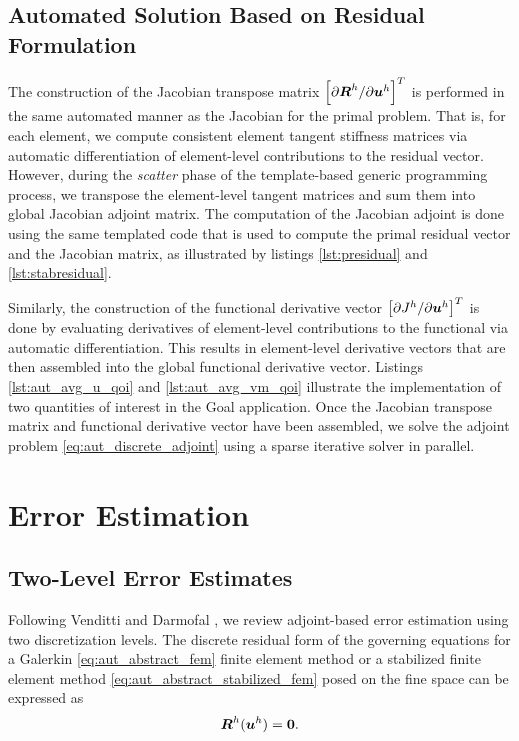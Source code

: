 \subsection{Automated Solution Based on Residual Formulation}

The construction of the Jacobian transpose matrix $\left[ \partial \boldsymbol{R}^h
/ \partial \boldsymbol{u}^h \right]^T$ is performed in the same automated manner as
the Jacobian for the primal problem. That is, for each element, we compute
consistent element tangent stiffness matrices via automatic differentiation
of element-level contributions to the residual vector. However, during the
\emph{scatter} phase of the template-based generic programming process,
we transpose the element-level tangent matrices and
sum them into global Jacobian adjoint matrix. The computation of the Jacobian
adjoint is done using the same templated code that is used to compute
the primal residual vector and the Jacobian matrix, as illustrated by
listings \ref{lst:presidual} and \ref{lst:stabresidual}.

Similarly, the construction of the functional derivative vector
$\left[ \partial J^h / \partial \boldsymbol{u}^h \right]^T$ is done by evaluating
derivatives of element-level contributions to the functional via automatic
differentiation. This results in element-level derivative vectors that are
then assembled into the global functional derivative vector. Listings
\ref{lst:aut_avg_u_qoi} and \ref{lst:aut_avg_vm_qoi} illustrate the
implementation of two quantities of interest in the Goal application. Once
the Jacobian transpose matrix and functional derivative vector have been
assembled, we solve the adjoint problem \eqref{eq:aut_discrete_adjoint} using
a sparse iterative solver in parallel.

\section{Error Estimation}

\subsection{Two-Level Error Estimates}

Following Venditti and Darmofal
\cite{venditti2000adjoint, venditti2002adjoint, venditti2003adjoint},
we review adjoint-based error estimation using two discretization levels.
The discrete residual form of the governing equations for a Galerkin
\eqref{eq:aut_abstract_fem} finite element method or a stabilized finite
element method \eqref{eq:aut_abstract_stabilized_fem} posed on the fine
space can be expressed as
%
\begin{gather}
\boldsymbol{R}^h(\boldsymbol{u}^h) = \boldsymbol{0}.
\label{eq:aut_fine_resid}
\end{gather}
%

